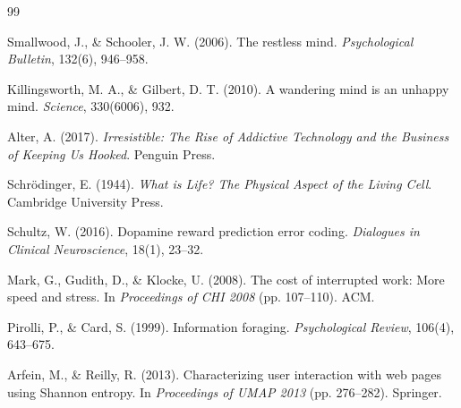 \documentclass[10pt,letterpaper]{article}
\begin{document}
\begin{thebibliography}{99}

Smallwood, J., \& Schooler, J. W. (2006). The restless mind. \textit{Psychological Bulletin}, 132(6), 946--958.

Killingsworth, M. A., \& Gilbert, D. T. (2010). A wandering mind is an unhappy mind. \textit{Science}, 330(6006), 932.

Alter, A. (2017). \textit{Irresistible: The Rise of Addictive Technology and the Business of Keeping Us Hooked}. Penguin Press.

Schr\"odinger, E. (1944). \textit{What is Life? The Physical Aspect of the Living Cell}. Cambridge University Press.

Schultz, W. (2016). Dopamine reward prediction error coding. \textit{Dialogues in Clinical Neuroscience}, 18(1), 23--32.

Mark, G., Gudith, D., \& Klocke, U. (2008). The cost of interrupted work: More speed and stress. In \textit{Proceedings of CHI 2008} (pp. 107--110). ACM.

Pirolli, P., \& Card, S. (1999). Information foraging. \textit{Psychological Review}, 106(4), 643--675.

Arfein, M., \& Reilly, R. (2013). Characterizing user interaction with web pages using Shannon entropy. In \textit{Proceedings of UMAP 2013} (pp. 276--282). Springer.

\end{thebibliography}
\end{document}
